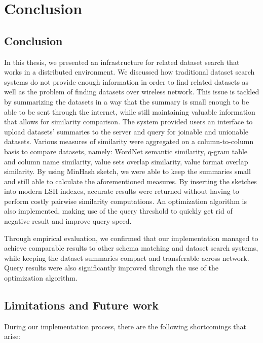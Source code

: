 


\chapter{Conclusion}
\label{chap:conclusion}
\pagestyle{plain}

\section{Conclusion}

In this thesis, we presented an infrastructure for related dataset search that works in a distributed environment. We discussed how traditional dataset search systems do not provide enough information in order to find related datasets as well as the problem of finding datasets over wireless network. This issue is tackled by summarizing the datasets in a way that the summary is small enough to be able to be sent through the internet, while still maintaining valuable information that allows for similarity comparison. The system provided users an interface to upload datasets' summaries to the server and query for joinable and unionable datasets. Various measures of similarity were aggregated on a column-to-column basis to compare datasets, namely: WordNet semantic similarity, q-gram table and column name similarity, value sets overlap similarity, value format overlap similarity. By using MinHash sketch, we were able to keep the summaries small and still able to calculate the aforementioned measures. By inserting the sketches into modern LSH indexes, accurate results were returned without having to perform costly pairwise similarity computations. An optimization algorithm is also implemented, making use of the query threshold to quickly get rid of negative result and improve query speed.

Through empirical evaluation, we confirmed that our implementation managed to achieve comparable results to other schema matching and dataset search systems, while keeping the dataset summaries compact and transferable across network. Query results were also significantly improved through the use of the optimization algorithm.

\section{Limitations and Future work}

During our implementation process, there are the following shortcomings that arise:

